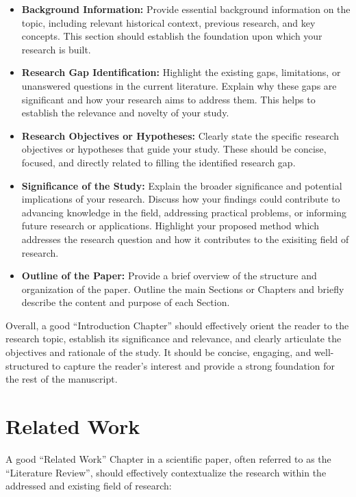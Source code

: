 \documentclass{article}
\begin{document}
\begin{itemize}
\item \textbf{Background Information:} Provide essential background information on the topic, including relevant historical context, previous research, and key concepts. This section should establish the foundation upon which your research is built.
\item \textbf{Research Gap Identification:} Highlight the existing gaps, limitations, or unanswered questions in the current literature. Explain why these gaps are significant and how your research aims to address them. This helps to establish the relevance and novelty of your study.
\item \textbf{Research Objectives or Hypotheses:} Clearly state the specific research objectives or hypotheses that guide your study. These should be concise, focused, and directly related to filling the identified research gap.
\item \textbf{Significance of the Study:} Explain the broader significance and potential implications of your research. Discuss how your findings could contribute to advancing knowledge in the field, addressing practical problems, or informing future research or applications. Highlight your proposed method which addresses the research question and how it contributes to the exisiting field of research.
\item \textbf{Outline of the Paper:} Provide a brief overview of the structure and organization of the paper. Outline the main Sections or Chapters and briefly describe the content and purpose of each Section.
\end{itemize}
	
Overall, a good ``Introduction Chapter'' should effectively orient the reader to the research topic, establish its significance and relevance, and clearly articulate the objectives and rationale of the study. It should be concise, engaging, and well-structured to capture the reader's interest and provide a strong foundation for the rest of the manuscript.

\section{Related Work}

A good ``Related Work'' Chapter in a scientific paper, often referred to as the ``Literature Review'', should effectively contextualize the research within the addressed and existing field of research:
\end{document}
